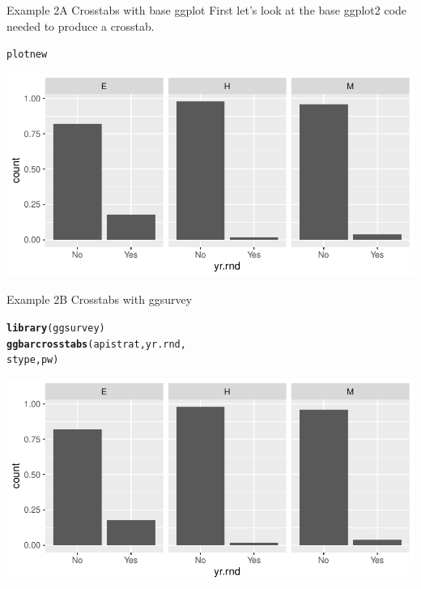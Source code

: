\documentclass{beamer}\usepackage[]{graphicx}\usepackage[]{xcolor}
\makeatletter
\newcommand{\hlstd}[1]{\textcolor[rgb]{0.345,0.345,0.345}{#1}}%
\newcommand{\hlkwd}[1]{\textcolor[rgb]{0.737,0.353,0.396}{\textbf{#1}}}%
\newenvironment{kframe}{%
 \def\at@end@of@kframe{}%
 \ifinner\ifhmode%
  \def\at@end@of@kframe{\end{minipage}}%
  \begin{minipage}{\columnwidth}%
 \fi\fi%
 \def\FrameCommand##1{\hskip\@totalleftmargin \hskip-\fboxsep
 \colorbox{shadecolor}{##1}\hskip-\fboxsep
     \hskip-\linewidth \hskip-\@totalleftmargin \hskip\columnwidth}%
 \MakeFramed {\advance\hsize-\width
   \@totalleftmargin\z@ \linewidth\hsize
   \@setminipage}}%
 {\par\unskip\endMakeFramed%
 \at@end@of@kframe}
\newenvironment{knitrout}{}{} %
\makeatother
\begin{document}
\begin{frame}[fragile]{Example 2A Crosstabs with base ggplot}
First let's look at the base ggplot2 code needed to produce a crosstab.
\begin{knitrout}
\color{fgcolor}\begin{kframe}
\begin{alltt}
\hlstd{plotnew}
\end{alltt}
\end{kframe}
\includegraphics[width=0.95\linewidth]{figure/unnamed-chunk-8-1} 
\end{knitrout}
\end{frame}

\begin{frame}[fragile]{Example 2B Crosstabs with ggsurvey}
\begin{knitrout}
\color{fgcolor}\begin{kframe}
\begin{alltt}
\hlkwd{library}\hlstd{(ggsurvey)}
\hlkwd{ggbarcrosstabs}\hlstd{(apistrat, yr.rnd,}
    \hlstd{stype, pw)}
\end{alltt}
\end{kframe}
\includegraphics[width=0.95\linewidth]{figure/unnamed-chunk-9-1} 
\end{knitrout}
\end{frame}
\end{document}
